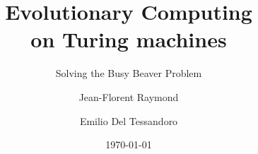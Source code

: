 \documentclass{beamer}
\title{\textbf{Evolutionary Computing\\on Turing machines}}
\subtitle{Solving the Busy Beaver Problem}
\author{Jean-Florent Raymond \and Emilio Del Tessandoro}
\institute[Uppsala University]{Uppsala University}
\date{\today}
\begin{document}
\begin{frame}
\titlepage
\end{frame}
\end{document}
